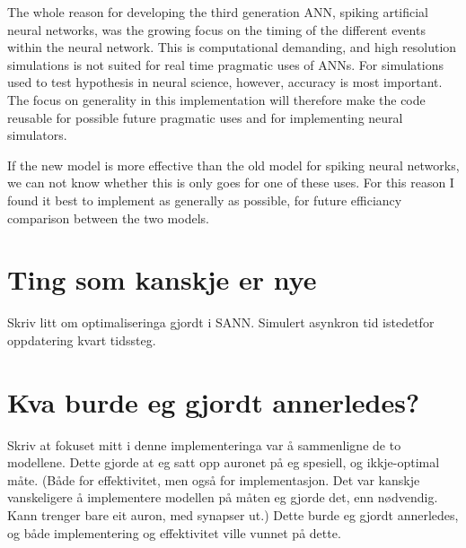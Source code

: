 The whole reason for developing the third generation ANN, spiking artificial neural networks, was the growing focus on the timing of the different events within the neural network.
This is computational demanding, and high resolution simulations is not suited for real time pragmatic uses of ANNs. For simulations used to test hypothesis in neural science, however, accuracy is most important.
The focus on generality in this implementation will therefore make the code reusable for possible future pragmatic uses and for implementing neural simulators.

If the new model is more effective than the old model for spiking neural networks, we can not know whether this is only goes for one of these uses. 
For this reason I found it best to implement as generally as possible, for future efficiancy comparison between the two models.















\section{Ting som kanskje er nye}
Skriv litt om optimaliseringa gjordt i SANN. Simulert asynkron tid istedetfor oppdatering kvart tidssteg.







\section{Kva burde eg gjordt annerledes?}
Skriv at fokuset mitt i denne implementeringa var å sammenligne de to modellene. Dette gjorde at eg satt opp auronet på eg spesiell, og ikkje-optimal måte.
(Både for effektivitet, men også for implementasjon. Det var kanskje vanskeligere å implementere modellen på måten eg gjorde det, enn nødvendig. Kann trenger bare eit auron, med synapser ut.)
Dette burde eg gjordt annerledes, og både implementering og effektivitet ville vunnet på dette.




